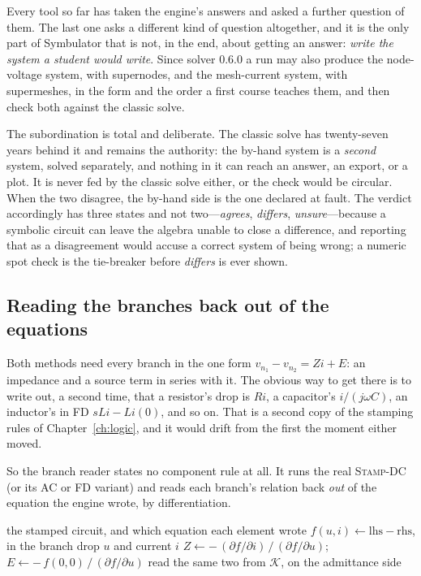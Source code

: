 \documentclass[11pt,oneside]{report}
\newcommand{\kw}[1]{\textsc{#1}}
\begin{document}
Every tool so far has taken the engine's answers and asked a further
question of them. The last one asks a different kind of question
altogether, and it is the only part of Symbulator that is not, in the
end, about getting an answer: \emph{write the system a student would
write}. Since solver 0.6.0 a run may also produce the node-voltage
system, with supernodes, and the mesh-current system, with
supermeshes, in the form and the order a first course teaches them,
and then check both against the classic solve.

The subordination is total and deliberate. The classic solve has
twenty-seven years behind it and remains the authority: the by-hand
system is a \emph{second} system, solved separately, and nothing in it
can reach an answer, an export, or a plot. It is never fed by the
classic solve either, or the check would be circular. When the two
disagree, the by-hand side is the one declared at fault. The verdict
accordingly has three states and not two---\emph{agrees},
\emph{differs}, \emph{unsure}---because a symbolic circuit can leave
the algebra unable to close a difference, and reporting that as a
disagreement would accuse a correct system of being wrong; a numeric
spot check is the tie-breaker before \emph{differs} is ever shown.

\subsection{Reading the branches back out of the equations}
\label{sec:branches}

Both methods need every branch in the one form
$v_{n_1} - v_{n_2} = Z i + E$: an impedance and a source term in
series with it. The obvious way to get there is to write out, a second
time, that a resistor's drop is $Ri$, a capacitor's $i/(j\omega C)$,
an inductor's in FD $sLi - Li(0)$, and so on. That is a second copy of
the stamping rules of Chapter~\ref{ch:logic}, and it would drift from
the first the moment either moved.

So the branch reader states no component rule at all. It runs the real
\kw{Stamp-DC} (or its AC or FD variant) and reads each branch's
relation back \emph{out} of the equation the engine wrote, by
differentiation.

\begin{algorithm}[htbp]
\caption{\kw{Read-Branches}: every branch as $v_{n_1} - v_{n_2}
  = Z i + E$}
\label{alg:branches}
\begin{algorithmic}[1]
\Require the stamped circuit, and which equation each element wrote
  \State $f(u, i) \gets \mathrm{lhs} - \mathrm{rhs}$, in the branch
    drop $u$ and current $i$
  \State $Z \gets -\,(\partial f/\partial i)\,/\,(\partial f/\partial u)$;
    \quad $E \gets -\,f(0,0)\,/\,(\partial f/\partial u)$
\EndFor
{}
  \State read the same two from $\mathcal{K}$, on the admittance side
\EndFor
\end{algorithmic}
\end{algorithm}
\end{document}
